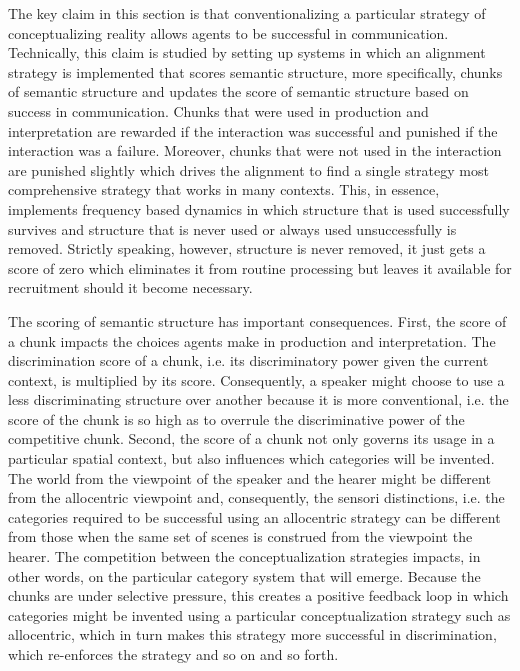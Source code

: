 The key claim in this section is that conventionalizing a particular strategy of 
conceptualizing reality allows agents to be successful in communication. 
Technically, this claim is studied by setting up systems in which an alignment strategy is 
implemented that scores semantic structure, more specifically, chunks of semantic structure
and updates the score of semantic structure based on success in communication. 
Chunks that were used in production and interpretation are rewarded
if the interaction was successful and punished if the interaction was a failure. 
Moreover, chunks that were not used in the interaction are punished slightly
which drives the alignment to find a single strategy most comprehensive strategy that
works in many contexts. This, in essence, implements frequency based dynamics in which structure
that is used successfully survives and structure that is never used or always used unsuccessfully
is removed. Strictly speaking, however, structure is never removed, it just gets a score of zero
which eliminates it from routine processing but leaves it available for recruitment should it become necessary.

The scoring of semantic structure has important consequences. First, the score of a chunk impacts
the choices agents make in production and interpretation. The discrimination score of a chunk, i.e. its discriminatory power given the current context, is multiplied by its score. Consequently,
a speaker might choose to use a less discriminating structure over another because it is 
more conventional, i.e. the score of the chunk is so high as to overrule the discriminative power of the
competitive chunk. Second, the score of a chunk not only governs its usage in a particular spatial context, 
but also influences which categories will be invented. The world from the viewpoint of the
speaker and the hearer might be different from the allocentric viewpoint and, consequently,
the sensori distinctions, i.e. the categories required to be successful using an allocentric strategy 
can be different from those when the same set of scenes is construed from the viewpoint the hearer.
The competition between the conceptualization strategies impacts, in other words, on the particular
category system that will emerge. Because the chunks are under selective pressure, this creates 
a positive feedback loop in which categories might be invented using a particular conceptualization
strategy such as allocentric, which in turn makes this strategy more successful in 
discrimination, which re-enforces the strategy and so on and so forth. 

